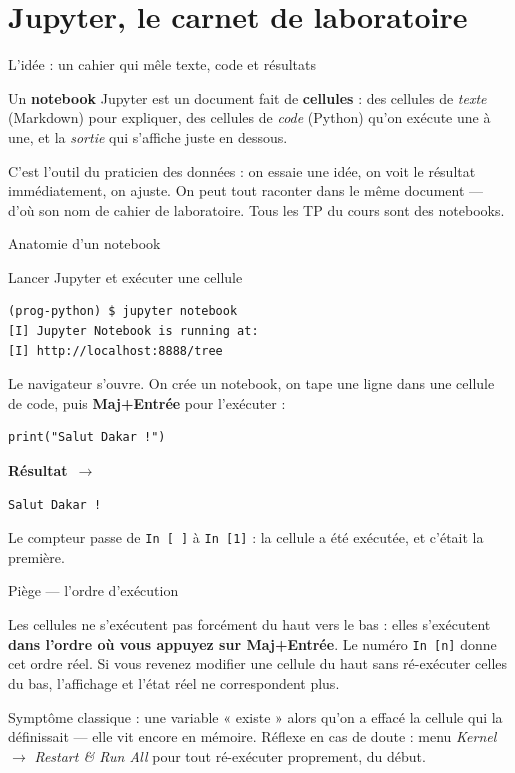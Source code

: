 \documentclass[aspectratio=169,11pt]{beamer}
\newcommand{\resultat}{{\scriptsize\textbf{R\'esultat}~$\rightarrow$}\par\vspace{1pt}}
\begin{document}
\section{Jupyter, le carnet de laboratoire}

\begin{frame}{L'idée : un cahier qui mêle texte, code et résultats}
\begin{ucaddef}
{\small Un \textbf{notebook} Jupyter est un document fait de \textbf{cellules} : des cellules de \emph{texte} (Markdown) pour expliquer, des cellules de \emph{code} (Python) qu'on exécute une à une, et la \emph{sortie} qui s'affiche juste en dessous.}
\end{ucaddef}
{\small C'est l'outil du praticien des données : on essaie une idée, on voit le résultat immédiatement, on ajuste. On peut tout raconter dans le même document — d'où son nom de cahier de laboratoire. Tous les TP du cours sont des notebooks.}
\end{frame}

\begin{frame}{Anatomie d'un notebook}
\end{frame}

\begin{frame}[fragile]{Lancer Jupyter et exécuter une cellule}
\begin{lstlisting}[style=sh]
(prog-python) $ jupyter notebook
[I] Jupyter Notebook is running at:
[I] http://localhost:8888/tree
\end{lstlisting}
{\small Le navigateur s'ouvre. On crée un notebook, on tape une ligne dans une cellule de code, puis \textbf{Maj+Entrée} pour l'exécuter :}
\begin{lstlisting}
print("Salut Dakar !")
\end{lstlisting}
\resultat
\begin{lstlisting}[style=out]
Salut Dakar !
\end{lstlisting}
{\small Le compteur passe de \texttt{In [\,]} à \texttt{In [1]} : la cellule a été exécutée, et c'était la première.}
\end{frame}

\begin{frame}{Piège — l'ordre d'exécution}
\begin{ucadpiege}
{\small Les cellules ne s'exécutent pas forcément du haut vers le bas : elles s'exécutent \textbf{dans l'ordre où vous appuyez sur Maj+Entrée}. Le numéro \texttt{In [n]} donne cet ordre réel. Si vous revenez modifier une cellule du haut sans ré-exécuter celles du bas, l'affichage et l'état réel ne correspondent plus.}
\end{ucadpiege}
{\small Symptôme classique : une variable « existe » alors qu'on a effacé la cellule qui la définissait — elle vit encore en mémoire. Réflexe en cas de doute : menu \emph{Kernel} $\rightarrow$ \emph{Restart \& Run All} pour tout ré-exécuter proprement, du début.}
\end{frame}
\end{document}

